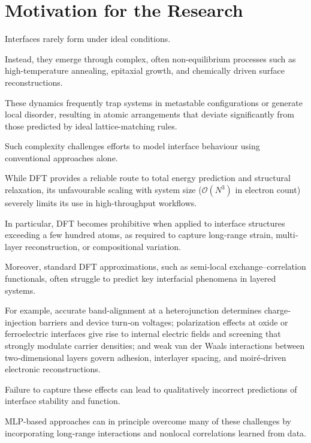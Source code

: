\section{Motivation for the Research} \label{section:motivation}

\label{para:nonideal_interface_formation} %

Interfaces rarely form under ideal conditions.

Instead, they emerge through complex, often non-equilibrium processes such as high-temperature annealing, epitaxial
growth, and chemically driven surface reconstructions.

These dynamics frequently trap systems in metastable configurations or generate local disorder, resulting in atomic
arrangements that deviate significantly from those predicted by ideal lattice-matching rules.

Such complexity challenges efforts to model interface behaviour using conventional approaches alone.

\label{para:dft_scaling_limitations} %

While DFT provides a reliable route to total energy prediction and structural relaxation,
its unfavourable scaling with system size ($\mathcal{O}(N^3)$ in electron count) severely limits its use in
high-throughput workflows.

In particular, DFT becomes prohibitive when applied to interface structures exceeding a few hundred atoms, as required
to capture long‐range strain, multi‐layer reconstruction, or compositional variation.

Moreover, standard DFT approximations, such as semi‐local exchange–correlation functionals, often struggle to predict key
interfacial phenomena in layered systems.

For example, accurate band‐alignment at a heterojunction determines charge‐injection barriers and device turn‐on
voltages; polarization effects at oxide or ferroelectric interfaces give rise to internal electric fields and
screening that strongly modulate carrier densities; and weak van der Waals interactions between two‐dimensional
layers govern adhesion, interlayer spacing, and moiré‐driven electronic reconstructions.

Failure to capture these effects can lead to qualitatively incorrect predictions of interface stability and function.

MLP-based approaches can in principle overcome many of these challenges by incorporating
long‐range interactions and nonlocal correlations learned from data.

